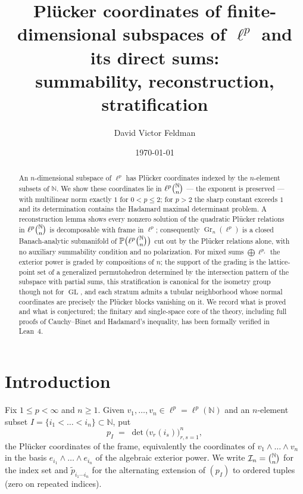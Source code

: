 \documentclass[11pt]{amsart}
\title[Pl\"ucker coordinates in $\ell^p$]{Pl\"ucker coordinates of finite-dimensional subspaces of $\ell^p$ and its direct sums:\\ summability, reconstruction, stratification}
\author{David Victor Feldman}
\date{\today}
\theoremstyle{definition}
\newcommand{\N}{\mathbb{N}}
\newcommand{\Gr}{\operatorname{Gr}}
\newcommand{\GL}{\operatorname{GL}}
\newcommand{\In}[1]{\tbinom{\N}{#1}}
\begin{document}
\begin{abstract}
An $n$-dimensional subspace of $\ell^p$ has Pl\"ucker coordinates indexed by the $n$-element subsets of $\N$. We show these coordinates lie in $\ell^p\In{n}$ --- the exponent is preserved --- with multilinear norm exactly $1$ for $0<p\le 2$; for $p>2$ the sharp constant exceeds $1$ and its determination contains the Hadamard maximal determinant problem. A reconstruction lemma shows every nonzero solution of the quadratic Pl\"ucker relations in $\ell^p\In{n}$ is decomposable with frame in $\ell^p$; consequently $\Gr_n(\ell^p)$ is a closed Banach-analytic submanifold of $\mathbb{P}\big(\ell^p\In{n}\big)$ cut out by the Pl\"ucker relations alone, with no auxiliary summability condition and no polarization. For mixed sums $\bigoplus \ell^{p_i}$ the exterior power is graded by compositions of $n$; the support of the grading is the lattice-point set of a generalized permutohedron determined by the intersection pattern of the subspace with partial sums, this stratification is canonical for the isometry group though not for $\GL$, and each stratum admits a tubular neighborhood whose normal coordinates are precisely the Pl\"ucker blocks vanishing on it. We record what is proved and what is conjectured; the finitary and single-space core of the theory, including full proofs of Cauchy--Binet and Hadamard's inequality, has been formally verified in Lean~4.
\end{abstract}

\maketitle
\setcounter{tocdepth}{1}
\tableofcontents

\section{Introduction}\label{sec:intro}

Fix $1\le p<\infty$ and $n\ge 1$. Given $v_1,\dots,v_n\in\ell^p=\ell^p(\N)$ and an $n$-element subset $I=\{i_1<\dots<i_n\}\subset\N$, put
\[
p_I \;=\; \det\big(v_r(i_s)\big)_{r,s=1}^{n},
\]
the Pl\"ucker coordinates of the frame, equivalently the coordinates of $v_1\wedge\dots\wedge v_n$ in the basis $e_{i_1}\wedge\dots\wedge e_{i_n}$ of the algebraic exterior power. We write $\mathcal{I}_n=\In{n}$ for the index set and $\tilde p_{i_1\cdots i_n}$ for the alternating extension of $(p_I)$ to ordered tuples (zero on repeated indices).
\end{document}
